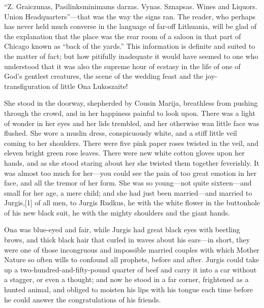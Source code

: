 \documentclass[
]{book}
\theoremstyle{definition}
\theoremstyle{definition}
\theoremstyle{definition}
\theoremstyle{definition}
\theoremstyle{remark}
\begin{document}
``Z. Graiczunas, Pasilinksminimams darzas. Vynas. Sznapsas. Wines and Liquors. Union Headquarters''---that was the way the signs ran. The reader, who perhaps has never held much converse in the language of far-off Lithuania, will be glad of the explanation that the place was the rear room of a saloon in that part of Chicago known as ``back of the yards.'' This information is definite and suited to the matter of fact; but how pitifully inadequate it would have seemed to one who understood that it was also the supreme hour of ecstasy in the life of one of God's gentlest creatures, the scene of the wedding feast and the joy-transfiguration of little Ona Lukoszaite!

She stood in the doorway, shepherded by Cousin Marija, breathless from pushing through the crowd, and in her happiness painful to look upon. There was a light of wonder in her eyes and her lids trembled, and her otherwise wan little face was flushed. She wore a muslin dress, conspicuously white, and a stiff little veil coming to her shoulders. There were five pink paper roses twisted in the veil, and eleven bright green rose leaves. There were new white cotton gloves upon her hands, and as she stood staring about her she twisted them together feverishly. It was almost too much for her---you could see the pain of too great emotion in her face, and all the tremor of her form. She was so young---not quite sixteen---and small for her age, a mere child; and she had just been married---and married to Jurgis,{[}1{]} of all men, to Jurgis Rudkus, he with the white flower in the buttonhole of his new black suit, he with the mighty shoulders and the giant hands.

Ona was blue-eyed and fair, while Jurgis had great black eyes with beetling brows, and thick black hair that curled in waves about his ears---in short, they were one of those incongruous and impossible married couples with which Mother Nature so often wills to confound all prophets, before and after. Jurgis could take up a two-hundred-and-fifty-pound quarter of beef and carry it into a car without a stagger, or even a thought; and now he stood in a far corner, frightened as a hunted animal, and obliged to moisten his lips with his tongue each time before he could answer the congratulations of his friends.
\end{document}

